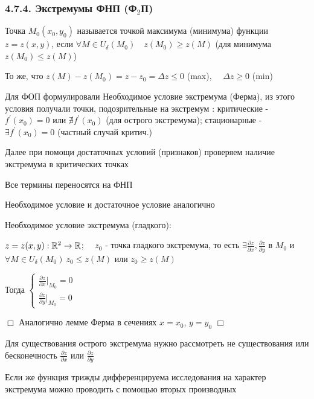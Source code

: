 \documentclass[12pt]{article}
\begin{document}
    \subsubsection{4.7.4. Экстремумы ФНП (Ф$_2$П)}

    \hypertarget{extremumsoffunctions}{}

    \Def Точка $M_0(x_0, y_0)$ называется точкой максимума (минимума) функции $z = z(x, y)$, если $\forall M \in U_\delta (M_0) \quad z(M_0) \geq z(M)$ (для минимума $z(M_0) \leq z(M)$)

    \Nota То же, что $z(M) - z(M_0) = z - z_0 = \Delta z \leq 0$ (max), $\quad \Delta z \geq 0$ (min)

    \Mem Для ФОП формулировали Необходимое условие экстремума (Ферма), из этого условия получали точки, подозрительные на экстремум : критические - $f^\prime(x_0) = 0$ или $\nexists f^\prime(x_0)$ (для острого экстремума); стационарные - $\exists f^\prime(x_0) = 0$ (частный случай критич.)

    Далее при помощи достаточных условий (признаков) проверяем наличие экстремума в критических точках

    \Nota Все термины переносятся на ФНП

    Необходимое условие и достаточное условие аналогично

    \hypertarget{extremumnecessarycondition}{}

    \Th Необходимое условие экстремума (гладкого):

    $z = z(x, y) : \mathbb{R}^2 \rightarrow \mathbb{R}$; $\quad z_0$ - точка гладкого экстремума,
    то есть $\exists \frac{\partial z}{\partial x}, \frac{\partial z}{\partial y}$ в $M_0$ и $\forall M \in U_\delta(M_0) \ z_0 \leq z(M)$ или $z_0 \geq z(M)$

    Тогда $\begin{cases}\frac{\partial z}{\partial x} |_{M_0} = 0 \\ \frac{\partial z}{\partial y} |_{M_0} = 0\end{cases}$

    $\Box$ Аналогично лемме Ферма в сечениях $x = x_0$, $y = y_0$ $\Box$

    Для существования острого экстремума нужно рассмотреть не существования или бесконечность $\frac{\partial z}{\partial x}$ или $\frac{\partial z}{\partial y}$

    Если же функция трижды дифференцируема исследования на характер экстремума можно проводить с помощью вторых производных

    \hypertarget{extremumsufficientcondition}{}
\end{document}
